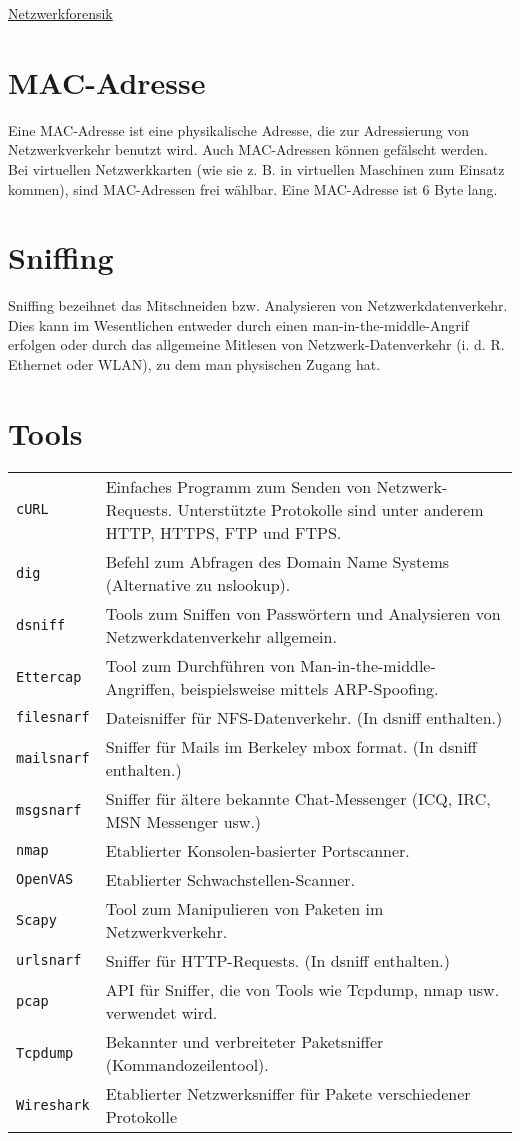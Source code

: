 \begin{center}
     \Large{\underline{Netzwerkforensik}} \\
\end{center}

\section{MAC-Adresse}
Eine MAC-Adresse ist eine physikalische Adresse, die zur Adressierung von Netzwerkverkehr benutzt wird. Auch MAC-Adressen können gefälscht werden. Bei virtuellen Netzwerkkarten (wie sie z. B. in virtuellen Maschinen zum Einsatz kommen), sind MAC-Adressen frei wählbar. Eine MAC-Adresse ist 6 Byte lang.
\section{Sniffing}
Sniffing bezeihnet das Mitschneiden bzw. Analysieren von Netzwerkdatenverkehr. Dies kann im Wesentlichen entweder durch einen man-in-the-middle-Angrif erfolgen oder durch das allgemeine Mitlesen von Netzwerk-Datenverkehr (i. d. R. Ethernet oder WLAN), zu dem man physischen Zugang hat. 
\section{Tools}
\begin{tabular}{@{}p{\the\MyLen}
		@{}p{\linewidth-\the\MyLen}@{}}
	\texttt{cURL} & Einfaches Programm zum Senden von Netzwerk-Requests. Unterstützte Protokolle sind unter anderem HTTP, HTTPS, FTP und FTPS.\\
	\texttt{dig} & Befehl zum Abfragen des Domain Name Systems (Alternative zu nslookup).\\
	\texttt{dsniff} & Tools zum Sniffen von Passwörtern und Analysieren von Netzwerkdatenverkehr allgemein.\\
	\texttt{Ettercap} & Tool zum Durchführen von Man-in-the-middle-Angriffen, beispielsweise mittels ARP-Spoofing.\\
	\texttt{filesnarf} & Dateisniffer für NFS-Datenverkehr. (In dsniff enthalten.)\\
	\texttt{mailsnarf} & Sniffer für Mails im Berkeley mbox format. (In dsniff enthalten.)\\
	\texttt{msgsnarf} & Sniffer für ältere bekannte Chat-Messenger (ICQ, IRC, MSN Messenger usw.)\\
	\texttt{nmap} & Etablierter Konsolen-basierter Portscanner.\\
	\texttt{OpenVAS} & Etablierter Schwachstellen-Scanner.\\
	\texttt{Scapy} & Tool zum Manipulieren von Paketen im Netzwerkverkehr.\\
	\texttt{urlsnarf} & Sniffer für HTTP-Requests. (In dsniff enthalten.)\\
	\texttt{pcap} & API für Sniffer, die von Tools wie Tcpdump, nmap usw. verwendet wird.\\
	\texttt{Tcpdump} & Bekannter und verbreiteter Paketsniffer (Kommandozeilentool).\\
	\texttt{Wireshark} & Etablierter Netzwerksniffer für Pakete verschiedener Protokolle\\
\end{tabular}

